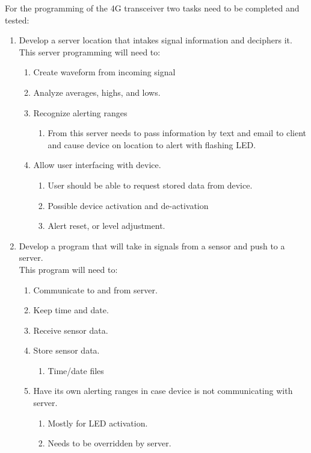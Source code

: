 \documentclass[12pt]{article}
\begin{document}
For the programming of the 4G transceiver two tasks need to be completed and tested:
\begin{enumerate}
	\item 	Develop a server location that intakes signal information and deciphers it.  \\This server programming will need to:
	
	\begin{enumerate}
		\item Create waveform from incoming signal
		\item Analyze averages, highs, and lows.
		\item Recognize alerting ranges
		\begin{enumerate}
			\item From this server needs to pass information by text and email to client and cause device on location to alert with flashing LED.
		\end{enumerate}
		\item Allow user interfacing with device.
		\begin{enumerate}
			\item User should be able to request stored data from device.
			\item Possible device activation and de-activation
			\item Alert reset, or level adjustment.
		\end{enumerate}
		
		
	\end{enumerate}
	\item Develop a program that will take in signals from a sensor and push to a server.  \\This program will need to:
	\begin{enumerate}
		\item Communicate to and from server.
		\item Keep time and date.
		\item Receive sensor data.
		\item Store sensor data.
		\begin{enumerate}
			\item Time/date files
		\end{enumerate}
		\item Have its own alerting ranges in case device is not communicating with server.  
		\begin{enumerate}
			\item Mostly for LED activation.
			\item Needs to be overridden by server.
		\end{enumerate}
	\end{enumerate}
\end{enumerate}
\end{document}

